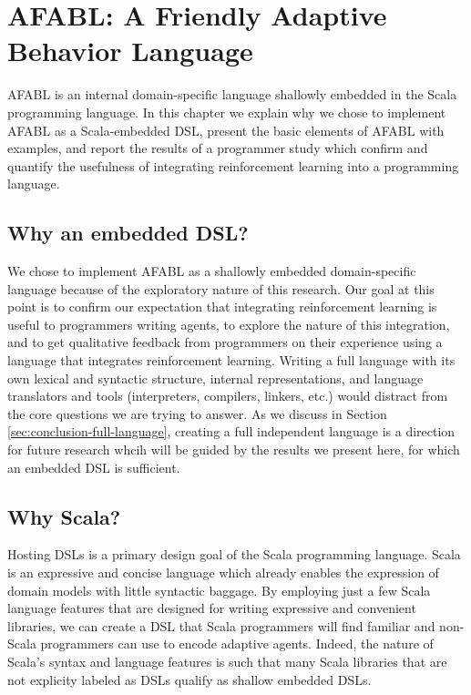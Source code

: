 \chapter{AFABL: A Friendly Adaptive Behavior Language}\label{ch:afabl}

AFABL is an internal domain-specific language shallowly embedded in the Scala programming language. In this chapter we explain why we chose to implement AFABL as a Scala-embedded DSL, present the basic elements of AFABL with examples, and report the results of a programmer study which confirm and quantify the usefulness of integrating reinforcement learning into a programming language.

\section{Why an embedded DSL?}

We chose to implement AFABL as a shallowly embedded domain-specific language because of the exploratory nature of this research. Our goal at this point is to confirm our expectation that integrating reinforcement learning is useful to programmers writing agents, to explore the nature of this integration, and to get qualitative feedback from programmers on their experience using a language that integrates reinforcement learning. Writing a full language with its own lexical and syntactic structure, internal representations, and language translators and tools (interpreters, compilers, linkers, etc.) would distract from the core questions we are trying to answer. As we discuss in Section \ref{sec:conclusion-full-language}, creating a full independent language is a direction for future research whcih will be guided by the results we present here, for which an embedded DSL is sufficient.

\section{Why Scala?}

Hosting DSLs is a primary design goal of the Scala programming language. Scala is an expressive and concise language which already enables the expression of domain models with little syntactic baggage. By employing just a few Scala language features that are designed for writing expressive and convenient libraries, we can create a DSL that Scala programmers will find familiar and non-Scala programmers can use to encode adaptive agents. Indeed, the nature of Scala's syntax and language features is such that many Scala libraries that are not explicity labeled as DSLs qualify as shallow embedded DSLs.


